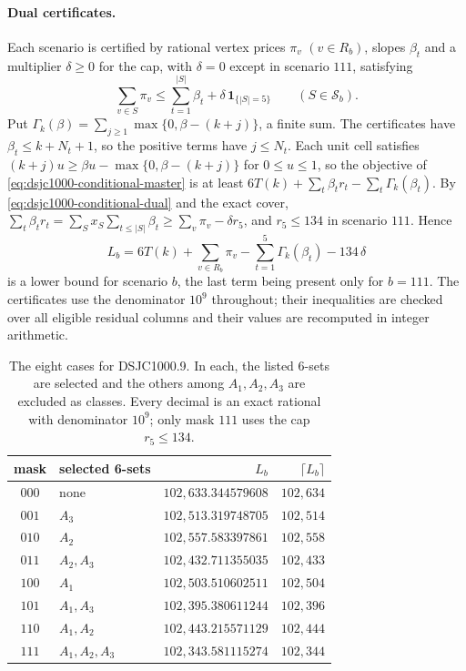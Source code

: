 \documentclass[11pt]{article}
\theoremstyle{definition}
\newcommand{\DSJCThousand}{\textnormal{\textsc{DSJC1000.9}}}
\newcommand{\Stable}{\mathcal{S}}
\begin{document}
\paragraph{Dual certificates.} Each scenario is certified by rational vertex
prices $\pi_v$ $(v\in R_b)$, slopes $\beta_t$ and a multiplier $\delta\ge0$
for the cap, with $\delta=0$ except in scenario $111$, satisfying
\begin{equation}
 \sum_{v\in S}\pi_v\le\sum_{t=1}^{|S|}\beta_t+\delta\,\mathbf 1_{\{|S|=5\}}
 \qquad(S\in\Stable_b).
\label{eq:dsjc1000-conditional-dual}
\end{equation}
Put $\Gamma_k(\beta)=\sum_{j\ge1}\max\{0,\beta-(k+j)\}$, a finite sum. The
certificates have $\beta_t\le k+N_t+1$, so the positive terms have $j\le N_t$.
Each unit cell satisfies $(k+j)u\ge\beta u-\max\{0,\beta-(k+j)\}$ for
$0\le u\le1$, so the objective of \eqref{eq:dsjc1000-conditional-master} is
at least $6T(k)+\sum_t\beta_tr_t-\sum_t\Gamma_k(\beta_t)$. By
\eqref{eq:dsjc1000-conditional-dual} and the exact cover,
$\sum_t\beta_tr_t=\sum_Sx_S\sum_{t\le|S|}\beta_t\ge\sum_v\pi_v-\delta r_5$,
and $r_5\le134$ in scenario $111$. Hence
\begin{equation}
 L_b=6T(k)+\sum_{v\in R_b}\pi_v-\sum_{t=1}^{5}\Gamma_k(\beta_t)-134\,\delta
 \label{eq:dsjc1000-scenario-bound}
\end{equation}
is a lower bound for scenario $b$, the last term being present only for
$b=111$. The certificates use the denominator $10^9$ throughout; their
inequalities are checked over all eligible residual columns and their values
are recomputed in integer arithmetic.

\begin{table}[t]
\centering
\caption{The eight cases for \DSJCThousand{}. In each, the listed 6-sets are
selected and the others among $A_1,A_2,A_3$ are excluded as classes. Every
decimal is an exact rational with denominator $10^9$; only mask $111$ uses the
cap $r_5\le134$.}
\label{tab:dsjc1000-scenarios}
\begin{tabular}{@{}clrr@{}}
\toprule
mask & selected 6-sets & $L_b$ & $\lceil L_b\rceil$\\
\midrule
$000$ & none              & $102{,}633.344579608$ & $102{,}634$\\
$001$ & $A_3$             & $102{,}513.319748705$ & $102{,}514$\\
$010$ & $A_2$             & $102{,}557.583397861$ & $102{,}558$\\
$011$ & $A_2,A_3$         & $102{,}432.711355035$ & $102{,}433$\\
$100$ & $A_1$             & $102{,}503.510602511$ & $102{,}504$\\
$101$ & $A_1,A_3$         & $102{,}395.380611244$ & $102{,}396$\\
$110$ & $A_1,A_2$         & $102{,}443.215571129$ & $102{,}444$\\
$111$ & $A_1,A_2,A_3$     & $102{,}343.581115274$ & $102{,}344$\\
\bottomrule
\end{tabular}
\end{table}
\end{document}

